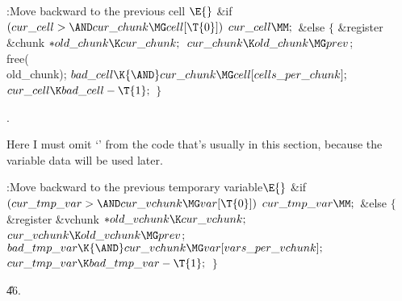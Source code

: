 \B{}:Move  backward to the previous cell%
\X${}\E{}$\6
\&{if} ${}(\\{cur\_cell}>{\AND}\\{cur\_chunk}\MG\\{cell}[\T{0}]){}$\1\5
${}\\{cur\_cell}\MM;{}$\2\6
\&{else}\5
${}\{{}$\1\6
\&{register} \&{chunk} ${}{*}\\{old\_chunk}\K\\{cur\_chunk};{}$\7
${}\\{cur\_chunk}\K\\{old\_chunk}\MG\\{prev}{}$;\5
\\{free}(\\{old\_chunk});\6
${}\\{bad\_cell}\K{\AND}\\{cur\_chunk}\MG\\{cell}[\\{cells\_per\_chunk}];{}$\6
${}\\{cur\_cell}\K\\{bad\_cell}-\T{1};{}$\6
\4${}\}{}$\2\par
{}.\fi

Here I must omit `' from the
code that's usually
in this section, because the variable data will be used later.

\Y\B\4:Move  backward to the previous temporary
variable\X${}\E{}$\6
\&{if} ${}(\\{cur\_tmp\_var}>{\AND}\\{cur\_vchunk}\MG\\{var}[\T{0}]){}$\1\5
${}\\{cur\_tmp\_var}\MM;{}$\2\6
\&{else}\5
${}\{{}$\1\6
\&{register} \&{vchunk} ${}{*}\\{old\_vchunk}\K\\{cur\_vchunk};{}$\7
${}\\{cur\_vchunk}\K\\{old\_vchunk}\MG\\{prev}{}$;\6
${}\\{bad\_tmp\_var}\K{\AND}\\{cur\_vchunk}\MG\\{var}[\\{vars\_per%
\_vchunk}];{}$\6
${}\\{cur\_tmp\_var}\K\\{bad\_tmp\_var}-\T{1};{}$\6
\4${}\}{}$\2\par
\U46.\fi

